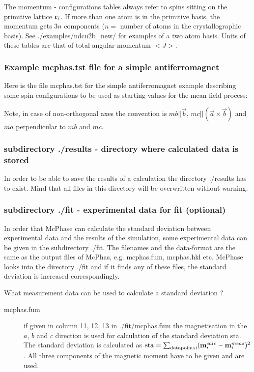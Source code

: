 The momentum - configurations tables always refer to spins sitting on
the primitive lattice ${\mathbf r}_i$. If more than one atom is in
the primitive basis, the momentum gets $3n$ components ($n=$ number
of atoms in the crystallographic basis). See {\prg ./examples/ndcu2b\_new/} for
examples of a two atom basis. Units of these tables are that of total 
angular momentum $<J>$.

\subsubsection{Example {\prg mcphas.tst} file  for a simple antiferromagnet}

Here is the file {\prg mcphas.tst} for the simple antiferromagnet example
describing some spin configurations
to be used as starting values for the mean field process:


Note, in case of non-orthogonal axes the convention 
is $mb||\vec b$, $mc||(\vec a \times \vec b)$ and $ma$ perpendicular to $mb$ and $mc$.

\subsubsection{subdirectory {\prg ./results} - directory where calculated data is stored}

In order to be able to save the results of a calculation the directory {\prg ./results} has to
exist. Mind that all files in this directory will be overwritten without warning. 

\subsubsection{subdirectory {\prg ./fit} - experimental data for fit (optional) } 

In order that {\prg McPhase} can calculate the standard deviation between
 experimental data and the results of the simulation, some experimental data
 can be given in the subdirectory {\prg ./fit}. The filenames and the data-format
 are the same as the output files of {\prg McPhas}, e.g. {\prg mcphas.fum}, {\prg mcphas.hkl}
 etc. {\prg McPhase} looks into the directory {\prg ./fit} and if it finds any
 of these files, the standard deviation is increased correspondingly. 

What measurement data can be used to calculate a standard deviation ?

\begin{description}
\item[{\prg mcphas.fum}] if given in column 11, 12, 13 in {\prg ./fit/mcphas.fum} the
            magnetisation in the $a$, $b$ and $c$ direction is used for calculation
	    of the standard deviation sta. The standard deviation is calculated
	    as ${\rm sta}=\sum_{\rm data points i} ({\mathbf m}_i^{calc}-{\mathbf m}_i^{meas})^2$.
	    All three components of the magnetic moment have to be given and are used.

\end{description}

